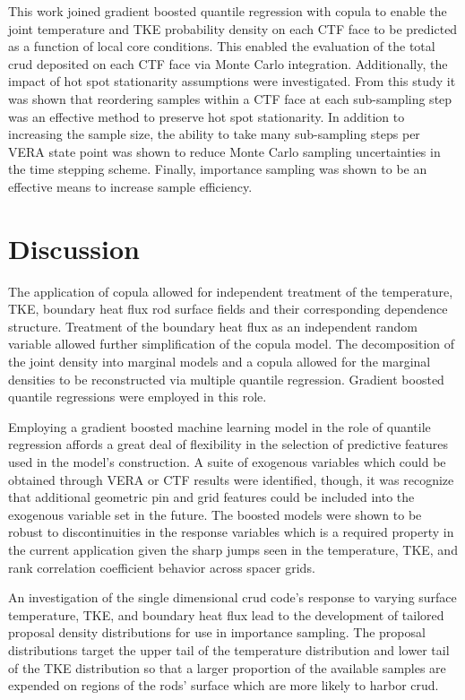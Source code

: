 
This work joined gradient boosted quantile regression with copula to enable the joint temperature and TKE probability density on each CTF face to be predicted as a function of local core conditions.  This enabled the evaluation of the total crud deposited on each CTF face via Monte Carlo integration.  Additionally, the impact of hot spot stationarity assumptions were investigated.  From this study it was shown that reordering samples within a CTF face at each sub-sampling step was an effective method to preserve hot spot stationarity.  In addition to increasing the sample size, the ability to take many sub-sampling steps per VERA state point was shown to reduce Monte Carlo sampling uncertainties in the time stepping scheme.  Finally, importance sampling was shown to be an effective means to increase sample efficiency.

\section{Discussion}

The application of copula allowed for independent treatment of the temperature, TKE, boundary heat flux rod surface fields and their corresponding dependence structure.  Treatment of the boundary heat flux as an independent random variable allowed further simplification of the copula model.  The decomposition of the joint density into marginal models and a copula allowed for the marginal densities to be reconstructed via multiple quantile regression.  Gradient boosted quantile regressions were employed in this role.

Employing a gradient boosted machine learning model in the role of quantile regression affords a great deal of flexibility in the selection of predictive features used in the model's construction.  A suite of exogenous variables which could be obtained through VERA or CTF results were identified, though, it was recognize that additional geometric pin and grid features could be included into the exogenous variable set in the future.  The boosted models were shown to be robust to discontinuities in the response variables which is a required property in the current application given the sharp jumps seen in the temperature, TKE, and rank correlation coefficient behavior across spacer grids.

An investigation of the single dimensional crud code's response to varying surface temperature, TKE, and boundary heat flux lead to the development of tailored proposal density distributions for use in importance sampling.   The proposal distributions target the upper tail of the temperature distribution and lower tail of the TKE distribution so that a larger proportion of the available samples are expended on regions of the rods' surface which are more likely to harbor crud.

